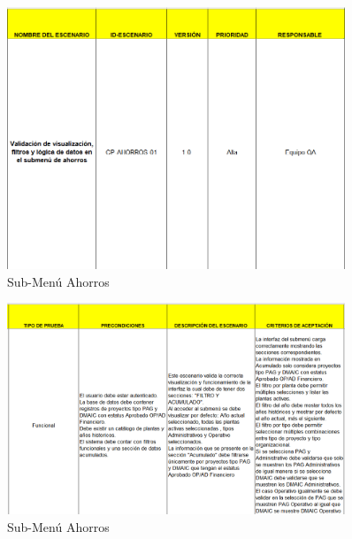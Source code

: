 \documentclass[12pt,letterpaper,spanish, xcolor=table]{report}
\numberwithin{figure}{subsection}
\begin{document}
	\begin{figure}[H]
		\centering
		\includegraphics[width=0.9\textwidth]
		{Imagenes/CenterPoint/EAhorros.png}
		\caption{Sub-Menú Ahorros}\label{a3}
	\end{figure}
	
	\begin{figure}[H]
		\centering
		\includegraphics[width=0.9\textwidth]
		{Imagenes/CenterPoint/EAhorro2.png}
		\caption{Sub-Menú Ahorros}\label{a3}
	\end{figure}
	
\end{document}
